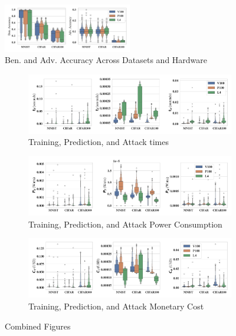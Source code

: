 \documentclass[conference]{IEEEtran}
\begin{document}
\begin{figure}[h!]
    \centering
    \includegraphics[width=0.5\textwidth,trim={30pt 0 10pt 0},clip]{plots/combined/acc.pdf}
    \caption{Ben. and Adv. Accuracy Across Datasets and Hardware}
    \label{fig:acc}
\end{figure}

\begin{figure}[h]
    \centering
    \begin{subfigure}[b]{.8\textwidth}
        \includegraphics[width=\linewidth,clip]{plots/combined/time.pdf}
        \caption{Training, Prediction, and Attack times}
        \label{fig:time}
    \end{subfigure}
    \begin{subfigure}[b]{.8\textwidth}
        \includegraphics[width=\linewidth,clip]{plots/combined/power.pdf}
        \caption{Training, Prediction, and Attack Power Consumption}
        \label{fig:power}
    \end{subfigure}
    \begin{subfigure}[b]{.8\textwidth}
        \includegraphics[width=\linewidth,clip]{plots/combined/cost.pdf}
        \caption{Training, Prediction, and Attack Monetary Cost}
        \label{fig:cost}
    \end{subfigure}
    \caption{Combined Figures}
\end{figure}
\end{document}
